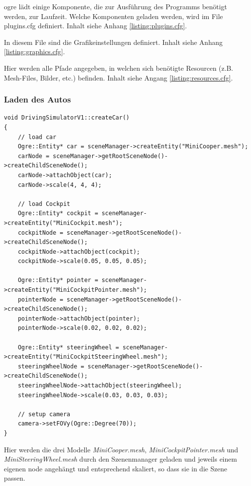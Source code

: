 \gls{ogre} lädt einige Komponente, die zur Ausführung des Programms benötigt werden, zur Laufzeit. Welche Komponenten geladen werden, wird im File plugins.cfg definiert. Inhalt siehe Anhang \ref{listing:plugins.cfg}.

In diesem File sind die Grafikeinstellungen definiert. Inhalt siehe Anhang \ref{listing:graphics.cfg}.

Hier werden alle Pfade angegeben, in welchen sich benötigte Resourcen (z.B. Mesh-Files, Bilder, etc.) befinden. Inhalt siehe Angang \ref{listing:resources.cfg}.

\subsubsection{Laden des Autos}

\begin{lstlisting}[caption={Laden des Autos},label={laden_auto}]
void DrivingSimulatorV1::createCar()
{
	// load car
	Ogre::Entity* car = sceneManager->createEntity("MiniCooper.mesh");
	carNode = sceneManager->getRootSceneNode()->createChildSceneNode();
	carNode->attachObject(car);
	carNode->scale(4, 4, 4);

	// load Cockpit
	Ogre::Entity* cockpit = sceneManager->createEntity("MiniCockpit.mesh");
	cockpitNode = sceneManager->getRootSceneNode()->createChildSceneNode();
	cockpitNode->attachObject(cockpit);
	cockpitNode->scale(0.05, 0.05, 0.05);

	Ogre::Entity* pointer = sceneManager->createEntity("MiniCockpitPointer.mesh");
	pointerNode = sceneManager->getRootSceneNode()->createChildSceneNode();
	pointerNode->attachObject(pointer);
	pointerNode->scale(0.02, 0.02, 0.02);

	Ogre::Entity* steeringWheel = sceneManager->createEntity("MiniCockpitSteeringWheel.mesh");
	steeringWheelNode = sceneManager->getRootSceneNode()->createChildSceneNode();
	steeringWheelNode->attachObject(steeringWheel);
	steeringWheelNode->scale(0.03, 0.03, 0.03);

	// setup camera
	camera->setFOVy(Ogre::Degree(70));
}
\end{lstlisting}

Hier werden die drei Modelle \textit{MiniCooper.mesh}, \textit{MiniCockpitPointer.mesh} und \textit{MiniSteeringWheel.mesh} durch den Szenenmanager geladen und jeweils einem eigenen \gls{node} angehängt und entsprechend skaliert, so dass sie in die Szene passen.

